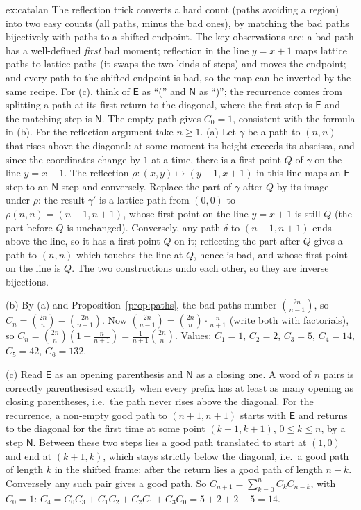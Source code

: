\begin{solution}{ex:catalan}
\idea The reflection trick converts a hard count (paths avoiding a region) into two easy counts (all paths, minus the bad ones), by matching the bad paths bijectively with paths to a shifted endpoint. The key observations are: a bad path has a well-defined \emph{first} bad moment; reflection in the line $y=x+1$ maps lattice paths to lattice paths (it swaps the two kinds of steps) and moves the endpoint; and every path to the shifted endpoint is bad, so the map can be inverted by the same recipe. For (c), think of $\mathsf E$ as ``('' and $\mathsf N$ as ``)''; the recurrence comes from splitting a path at its first return to the diagonal, where the first step is $\mathsf E$ and the matching step is $\mathsf N$.
\writeup The empty path gives $C_0=1$, consistent with the formula in (b). For the reflection argument take $n\ge1$. (a) Let $\gamma$ be a path to $(n,n)$ that rises above the diagonal: at some moment its height exceeds its abscissa, and since the coordinates change by $1$ at a time, there is a first point $Q$ of $\gamma$ on the line $y=x+1$. The reflection $\rho:(x,y)\mapsto(y-1,x+1)$ in this line maps an $\mathsf E$ step to an $\mathsf N$ step and conversely. Replace the part of $\gamma$ after $Q$ by its image under $\rho$: the result $\gamma'$ is a lattice path from $(0,0)$ to $\rho(n,n)=(n-1,n+1)$, whose first point on the line $y=x+1$ is still $Q$ (the part before $Q$ is unchanged). Conversely, any path $\delta$ to $(n-1,n+1)$ ends above the line, so it has a first point $Q$ on it; reflecting the part after $Q$ gives a path to $(n,n)$ which touches the line at $Q$, hence is bad, and whose first point on the line is $Q$. The two constructions undo each other, so they are inverse bijections.

(b) By (a) and Proposition~\ref{prop:paths}, the bad paths number $\binom{2n}{n-1}$, so $C_n=\binom{2n}n-\binom{2n}{n-1}$. Now
$\binom{2n}{n-1}=\binom{2n}n\cdot\frac{n}{n+1}$ (write both with factorials), so $C_n=\binom{2n}n\left(1-\frac n{n+1}\right)=\frac1{n+1}\binom{2n}n$.
Values: $C_1=1$, $C_2=2$, $C_3=5$, $C_4=14$, $C_5=42$, $C_6=132$.

(c) Read $\mathsf E$ as an opening parenthesis and $\mathsf N$ as a closing one. A word of $n$ pairs is correctly parenthesised exactly when every prefix has at least as many opening as closing parentheses, i.e.\ the path never rises above the diagonal. For the recurrence, a non-empty good path to $(n+1,n+1)$ starts with $\mathsf E$ and returns to the diagonal for the first time at some point $(k+1,k+1)$, $0\le k\le n$, by a step $\mathsf N$. Between these two steps lies a good path translated to start at $(1,0)$ and end at $(k+1,k)$, which stays strictly below the diagonal, i.e.\ a good path of length $k$ in the shifted frame; after the return lies a good path of length $n-k$. Conversely any such pair gives a good path. So $C_{n+1}=\sum_{k=0}^nC_kC_{n-k}$, with $C_0=1$: $C_4=C_0C_3+C_1C_2+C_2C_1+C_3C_0=5+2+2+5=14$.
\end{solution}

